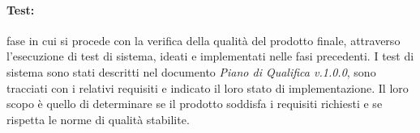 \paragraph{Test:} fase in cui si procede con la verifica della qualità del prodotto finale, attraverso l'esecuzione di test di sistema, ideati e implementati nelle fasi precedenti. \newline
I test di sistema sono stati descritti nel documento \textit{Piano di Qualifica v.1.0.0}, sono tracciati con i relativi requisiti e indicato il loro stato di implementazione. \newline
Il loro scopo è quello di determinare se il prodotto soddisfa i requisiti richiesti e se rispetta le norme di qualità stabilite.

